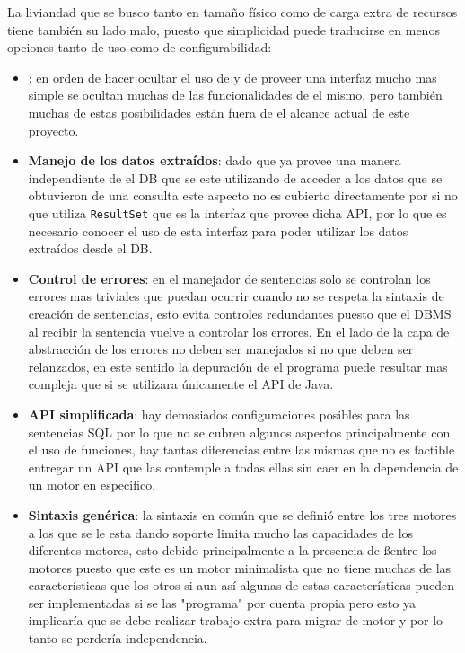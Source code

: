 La liviandad que se busco tanto en tamaño físico como de carga extra de recursos tiene también su lado malo, puesto que simplicidad puede traducirse en menos opciones tanto de uso como de configurabilidad:
%
\begin{itemize}
\item \textbf{\jd}: en orden de hacer ocultar el uso de \jd y de proveer una interfaz mucho mas simple se ocultan muchas de las funcionalidades de el mismo, pero también muchas de estas posibilidades están fuera de el alcance actual de este proyecto.
%
\item \textbf{Manejo de los datos extraídos}: dado que \jd ya provee una manera independiente de el DB que se este utilizando de acceder a los datos que se obtuvieron de una consulta este aspecto no es cubierto directamente por \jj si no que utiliza \verb=ResultSet= que es la interfaz que provee dicha API, por lo que es necesario conocer el uso de esta interfaz para poder utilizar los datos extraídos desde el DB.
%
\item \textbf{Control de errores}: en el manejador de sentencias solo se controlan los errores mas triviales que puedan ocurrir cuando no se respeta la sintaxis de creación de sentencias, esto evita controles redundantes puesto que el DBMS al recibir la sentencia vuelve a controlar los errores. En el lado de la capa de abstracción de \jd los errores no deben ser manejados si no que deben ser relanzados, en este sentido la depuración de el programa puede resultar mas compleja que si se utilizara únicamente el API de Java.
%
\item \textbf{API simplificada}: hay demasiados configuraciones posibles para las sentencias SQL por lo que no se cubren algunos aspectos principalmente con el uso de funciones, hay tantas diferencias entre las mismas que no es factible entregar un API que las contemple a todas ellas sin caer en la dependencia de un motor en especifico.
%
\item \textbf{Sintaxis genérica}: la sintaxis en común que se definió entre los tres motores a los que se le esta dando soporte limita mucho las capacidades de los diferentes motores, esto debido principalmente a la presencia de \ss entre los motores puesto que este es un motor minimalista que no tiene muchas de las características que los otros si aun así algunas de estas características pueden ser implementadas si se las "programa" por cuenta propia pero esto ya implicaría que se debe realizar trabajo extra para migrar de motor y por lo tanto se perdería independencia. 
\end{itemize}
%
%
%
